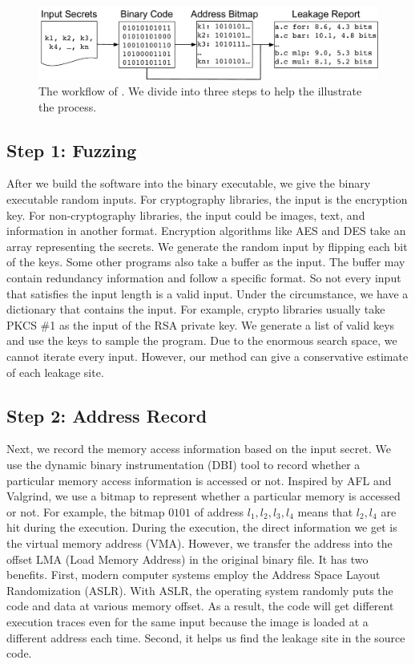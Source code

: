 \begin{figure}[ht]
  \centering
  \includegraphics[width=.9\columnwidth]{./figures/chapter5/workflow.pdf}
  \caption{The workflow of \ctool{}. We divide \ctool{} into three steps to help the illustrate the process. }\label{chapter5:fig:workflow}
\end{figure}

\subsection{Step 1: Fuzzing}
After we build the software into the binary executable, we give the
binary executable random inputs. For cryptography libraries, the input
is the encryption key. For non-cryptography libraries, the input could
be images, text, and information in another format. Encryption
algorithms like AES and DES take an array representing the secrets. We
generate the random input by flipping each bit of the keys. Some other
programs also take a buffer as the input. The buffer may contain 
redundancy information and follow a specific format. So not every input
that satisfies the input length is a valid input. Under the
circumstance, we have a dictionary that contains the input. For
example, crypto libraries usually take PKCS \#1 as the input of the
RSA private key. We generate a list of valid
keys and use the keys to sample the program. Due to the enormous search
space, we cannot iterate every input. However, our method can give a
conservative estimate of each leakage site.

\subsection{Step 2: Address Record}
Next, we record the memory access information based on the input
secret. We use the dynamic binary instrumentation (DBI) tool to record
whether a particular memory access information is accessed or
not. Inspired by AFL and Valgrind, we use a bitmap to represent
whether a particular memory is accessed or not. For example, the
bitmap ${0101}$ of address $l_1, l_2, l_3, l_4$ means that $l_2, l_4$
are hit during the execution. During the execution, the direct
information we get is the virtual memory address (VMA). However, we
transfer the address into the offset LMA (Load Memory Address) in
the original binary file. It has two benefits. First, modern computer
systems employ the Address Space Layout Randomization (ASLR). With
ASLR, the operating system randomly puts the code and data at
various memory offset. As a result, the code will get different
execution traces even for the same input because the image is
loaded at a different address each time. Second, it helps us find the
leakage site in the source code.

